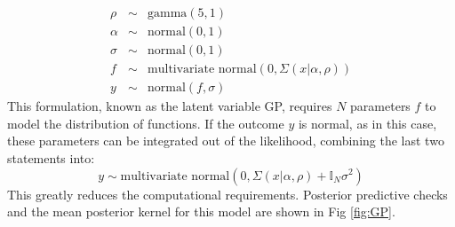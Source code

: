 \begin{eqnarray} \label{eq:GP}
\rho &\sim & \text{gamma}(5,1)\\
\alpha &\sim & \text{normal}(0,1) \\
\sigma &\sim & \text{normal}(0,1) \\
f &\sim & \text{multivariate normal}(0,\Sigma(x | \alpha,\rho)) \\
y &\sim & \text{normal}(f,\sigma) \label{eq:GPfin}
\end{eqnarray}
This formulation, known as the latent variable GP, requires \(N\) parameters \(f\) to model the distribution of functions. If the outcome \(y\) is normal, as in this case, these parameters can be integrated out of the likelihood, combining the last two statements into:
\[
y \sim \text{multivariate normal}(0,\Sigma(x | \alpha,\rho) + \mathbb I_N\sigma^2) \label{eq:reduced-likelihood} \tag{2.65}
\]
This greatly reduces the computational requirements. Posterior predictive checks and the mean posterior kernel for this
model are shown in Fig \ref{fig:GP}.

